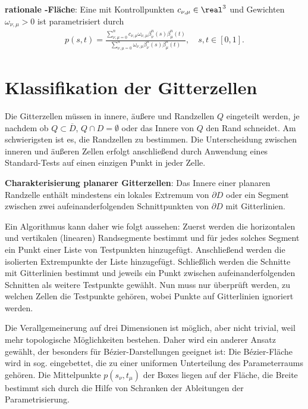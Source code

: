 \textbf{rationale -Fläche}:
Eine  mit Kontrollpunkten $c_{\nu,\mu} \in \real^3$ und
Gewichten $\omega_{\nu,\mu} > 0$ ist parametrisiert durch
\begin{align*}
    p(s, t) = \frac{\sum_{\nu,\mu=0}^n c_{\nu,\mu} \omega_{\nu,\mu} \beta_\nu^n(s) \beta_\mu^n(t)}
    {\sum_{\nu,\mu=0}^n \omega_{\nu,\mu} \beta_\nu^n(s) \beta_\mu^n(t)},\quad
    s, t \in [0, 1].
\end{align*}

\section{%
    Klassifikation der Gitterzellen%
}

Die Gitterzellen müssen in innere, äußere und Randzellen $Q$ eingeteilt werden, je nachdem
ob $Q \subset \overline{D}$, $Q \cap D = \emptyset$ oder das Innere von $Q$ den Rand schneidet.
Am schwierigsten ist es, die Randzellen zu bestimmen.
Die Unterscheidung zwischen inneren und äußeren Zellen erfolgt anschließend durch Anwendung
eines Standard-Tests auf einen einzigen Punkt in jeder Zelle.

\textbf{Charakterisierung planarer Gitterzellen}:
Das Innere einer planaren Randzelle enthält mindestens ein lokales Extremum von $\partial D$
oder ein Segment zwischen zwei aufeinanderfolgenden Schnittpunkten von $\partial D$ mit
Gitterlinien.

Ein Algorithmus kann daher wie folgt aussehen:
Zuerst werden die horizontalen und vertikalen (linearen) Randsegmente bestimmt
und für jedes solches Segment ein Punkt einer Liste von Testpunkten hinzugefügt.
Anschließend werden die isolierten Extrempunkte der Liste hinzugefügt.
Schließlich werden die Schnitte mit Gitterlinien bestimmt und jeweils ein Punkt zwischen
aufeinanderfolgenden Schnitten als weitere Testpunkte gewählt.
Nun muss nur überprüft werden, zu welchen Zellen die Testpunkte gehören,
wobei Punkte auf Gitterlinien ignoriert werden.

\linie
\pagebreak

Die Verallgemeinerung auf drei Dimensionen ist möglich, aber nicht trivial,
weil mehr topologische Möglichkeiten bestehen.
Daher wird ein anderer Ansatz gewählt, der besonders für Bézier-Darstellungen geeignet ist:
Die Bézier-Fläche wird in sog.
 eingebettet, die zu einer uniformen Unterteilung
des Parameterraums gehören.
Die Mittelpunkte $p(s_\nu, t_\mu)$ der Boxes liegen auf der Fläche,
die Breite bestimmt sich durch die Hilfe von Schranken der Ableitungen der Parametrisierung.

